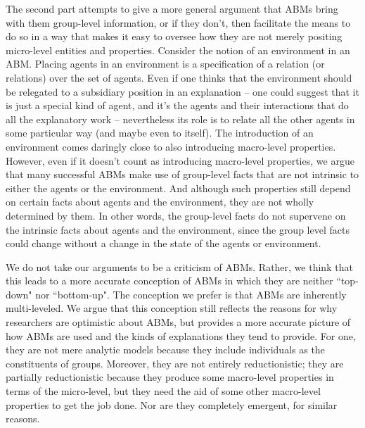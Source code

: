 \documentclass[11pt]{article}
\begin{document}
The second part attempts to give a more general argument that ABMs bring with them group-level information, or if they don't, then facilitate the means to do so in a way that makes it easy to oversee how they are not merely positing micro-level entities and properties. Consider the notion of an environment in an ABM. Placing agents in an environment is a specification of a relation (or relations) over the set of agents. Even if one thinks that the environment should be relegated to a subsidiary position in an explanation -- one could suggest that it is just a special kind of agent, and it's the agents and their interactions that do all the explanatory work -- nevertheless its role is to relate all the other agents in some particular way (and maybe even to itself). The introduction of an environment comes daringly close to also introducing macro-level properties. However, even if it doesn't count as introducing macro-level properties, we argue that many successful ABMs make use of group-level facts that are not intrinsic to either the agents or the environment.  And although such properties still depend on certain facts about agents and the environment, they are not wholly determined by them. In other words, the group-level facts do not supervene on the intrinsic facts about agents and the environment, since the group level facts could change without a change in the state of the agents or environment. 

We do not take our arguments to be a criticism of ABMs. Rather, we think that this leads to a more accurate conception of ABMs in which they are neither ``top-down" nor ``bottom-up". The conception we prefer is that ABMs are inherently multi-leveled.  We argue that this conception still reflects the reasons for why researchers are optimistic about ABMs, but provides a more accurate picture of how ABMs are used and the kinds of explanations they tend to provide.  For one, they are not mere analytic models because they include individuals as the constituents of groups. Moreover, they are not entirely reductionistic; they are partially reductionistic because they produce some macro-level properties in terms of the micro-level, but they need the aid of some other macro-level properties to get the job done. Nor are they completely emergent, for similar reasons.
\end{document}
